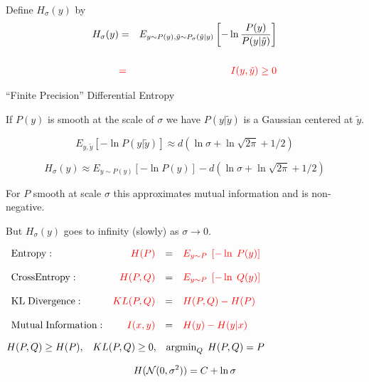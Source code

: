 {{\vfill
Define $H_\sigma(y)$ by
\begin{eqnarray*}
H_\sigma(y) & = & E_{y \sim P(y),\tilde{y} \sim P_\sigma(\tilde{y}|y)}\left[ -\ln \frac{P(y)}{P(y|\tilde{y})}\right] \\
\\
& {\color{red} =} & {\color{red} I(y,\tilde{y}) \geq 0}
\end{eqnarray*}


{``Finite Precision'' Differential Entropy}

If $P(y)$ is smooth at the scale of $\sigma$ we have $P(y|\tilde{y})$ is a Gaussian centered at $\tilde{y}$.

$$E_{y,\tilde{y}}[- \ln P(y|\tilde{y})] \approx d(\ln \sigma + \ln{\sqrt{2\pi}} + 1/2)$$

$$H_\sigma(y) \approx E_{y \sim P(y)}\left[ - \ln P(y)\right]  - d(\ln \sigma + \ln \sqrt{2\pi} + 1/2)$$

\vfill
For $P$ smooth at scale $\sigma$ this approximates mutual information and is non-negative.

\vfill
But $H_\sigma(y)$ goes to infinity (slowly) as $\sigma \rightarrow 0$.

\vfill

}

      
\centerline{
  $\begin{array}{lrcl}
\mathrm{Entropy}: & {\color{red} H(P)} & = & {\color{red} E_{y \sim P}\;\left[-\ln\;P(y)\right]} \\
\\
\mathrm{Cross Entropy:} & {\color{red} H(P,Q)} & = & {\color{red} E_{y \sim P}\;\left[-\ln\;Q(y)\right]} \\
\\
\mathrm{KL\; Divergence:} & {\color{red} KL(P,Q)} & = & {\color{red} H(P,Q) - H(P)} \\
\\
\mathrm{Mutual\; Information:} & {\color{red} I(x,y)} & = & {\color{red} H(y) - H(y|x)}
\end{array}$}

\vfill
\centerline{{\color{red} $H(P,Q) \geq H(P),\;\;\;KL(P,Q) \geq 0,\;\;\;\operatorname*{argmin}_Q\;H(P,Q) = P$}}


}



$$H({\cal N}(0,\sigma^2)) = C + \ln \sigma$$

